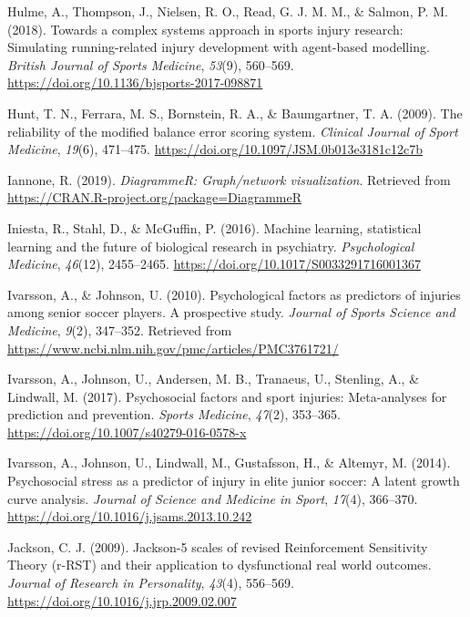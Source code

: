 \documentclass[man,floatsintext]{apa6}
\begin{document}
\leavevmode\hypertarget{ref-Hulme2018}{}%
Hulme, A., Thompson, J., Nielsen, R. O., Read, G. J. M. M., \& Salmon, P. M. (2018). Towards a complex systems approach in sports injury research: Simulating running-related injury development with agent-based modelling. \emph{British Journal of Sports Medicine}, \emph{53}(9), 560--569. \url{https://doi.org/10.1136/bjsports-2017-098871}

\leavevmode\hypertarget{ref-Hunt2009}{}%
Hunt, T. N., Ferrara, M. S., Bornstein, R. A., \& Baumgartner, T. A. (2009). The reliability of the modified balance error scoring system. \emph{Clinical Journal of Sport Medicine}, \emph{19}(6), 471--475. \url{https://doi.org/10.1097/JSM.0b013e3181c12c7b}

\leavevmode\hypertarget{ref-R-DiagrammeR}{}%
Iannone, R. (2019). \emph{DiagrammeR: Graph/network visualization}. Retrieved from \url{https://CRAN.R-project.org/package=DiagrammeR}

\leavevmode\hypertarget{ref-Iniesta2016}{}%
Iniesta, R., Stahl, D., \& McGuffin, P. (2016). Machine learning, statistical learning and the future of biological research in psychiatry. \emph{Psychological Medicine}, \emph{46}(12), 2455--2465. \url{https://doi.org/10.1017/S0033291716001367}

\leavevmode\hypertarget{ref-Ivarsson2010}{}%
Ivarsson, A., \& Johnson, U. (2010). Psychological factors as predictors of injuries among senior soccer players. A prospective study. \emph{Journal of Sports Science and Medicine}, \emph{9}(2), 347--352. Retrieved from \url{https://www.ncbi.nlm.nih.gov/pmc/articles/PMC3761721/}

\leavevmode\hypertarget{ref-Ivarsson2017}{}%
Ivarsson, A., Johnson, U., Andersen, M. B., Tranaeus, U., Stenling, A., \& Lindwall, M. (2017). Psychosocial factors and sport injuries: Meta-analyses for prediction and prevention. \emph{Sports Medicine}, \emph{47}(2), 353--365. \url{https://doi.org/10.1007/s40279-016-0578-x}

\leavevmode\hypertarget{ref-Ivarsson2014}{}%
Ivarsson, A., Johnson, U., Lindwall, M., Gustafsson, H., \& Altemyr, M. (2014). Psychosocial stress as a predictor of injury in elite junior soccer: A latent growth curve analysis. \emph{Journal of Science and Medicine in Sport}, \emph{17}(4), 366--370. \url{https://doi.org/10.1016/j.jsams.2013.10.242}

\leavevmode\hypertarget{ref-Jackson2009}{}%
Jackson, C. J. (2009). Jackson-5 scales of revised Reinforcement Sensitivity Theory (r-RST) and their application to dysfunctional real world outcomes. \emph{Journal of Research in Personality}, \emph{43}(4), 556--569. \url{https://doi.org/10.1016/j.jrp.2009.02.007}
\end{document}
